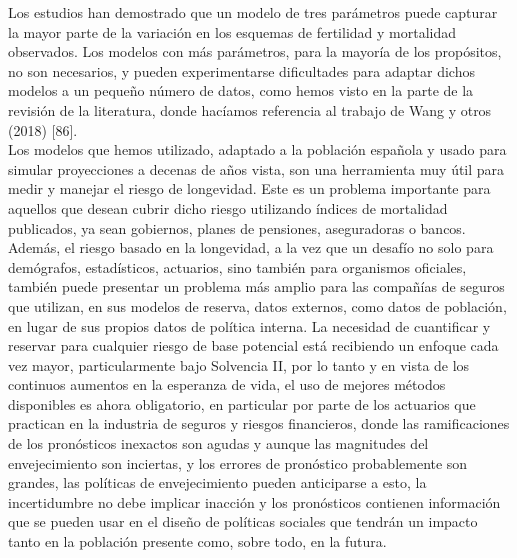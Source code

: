 Los estudios han demostrado que un modelo de tres parámetros puede capturar la mayor parte de la variación en los esquemas de fertilidad y mortalidad observados. Los modelos con más parámetros, para la mayoría de los propósitos, no son necesarios, y pueden experimentarse dificultades para adaptar dichos modelos a un pequeño número de datos, como hemos visto en la parte de la revisión de la literatura, donde hacíamos referencia al trabajo de Wang y otros (2018) [86].\\

Los modelos que hemos utilizado, adaptado a la población española y usado para simular proyecciones a decenas de años vista, son una herramienta muy útil para medir y manejar el riesgo de longevidad. Este es un problema importante para aquellos que desean cubrir dicho riesgo utilizando índices de mortalidad publicados, ya sean gobiernos, planes de pensiones, aseguradoras o bancos. Además, el riesgo basado en la longevidad, a la vez que un desafío no solo para demógrafos, estadísticos, actuarios, sino también para organismos oficiales, también puede presentar un problema más amplio para las compañías de seguros que utilizan, en sus modelos de reserva, datos externos, como datos de población, en lugar de sus propios datos de política interna. La necesidad de cuantificar y reservar para cualquier riesgo de base potencial está recibiendo un enfoque cada vez mayor, particularmente bajo Solvencia II, por lo tanto y en vista de los continuos aumentos en la esperanza de vida, el uso de mejores métodos disponibles es ahora obligatorio, en particular por parte de los actuarios que practican en la industria de seguros y riesgos financieros, donde las ramificaciones de los pronósticos inexactos son agudas y aunque las magnitudes del envejecimiento son inciertas, y los errores de pronóstico probablemente son grandes, las políticas de envejecimiento pueden anticiparse a esto, la incertidumbre no debe implicar inacción y los pronósticos contienen información que se pueden usar en el diseño de políticas sociales que tendrán un impacto tanto en la población presente como, sobre todo, en la futura.


